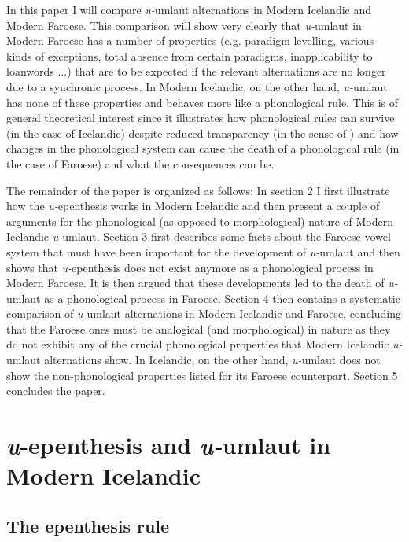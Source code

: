 \documentclass[output=paper,
modfonts
]{LSP/langsci}
\begin{document}
In this paper I will compare \emph{u-}umlaut alternations in Modern
Icelandic and Modern Faroese. This comparison will show very clearly
that \emph{u-}umlaut in Modern Faroese has a number of properties (e.g.
paradigm levelling, various kinds of exceptions, total absence from
certain paradigms, inapplicability to loanwords ...) that are to be
expected if the relevant alternations are no longer due to a synchronic
process. In Modern Icelandic, on the other hand, \emph{u-}umlaut has
none of these properties and behaves more like a phonological rule. This
is of general theoretical interest since it illustrates how phonological
rules can survive (in the case of Icelandic) despite reduced
transparency (in the sense of \citealt{kiparsky1973}) and how changes in the
phonological system can cause the death of a phonological rule (in the
case of Faroese) and what the consequences can be.

The remainder of the paper is organized as follows: In section 2 I first
illustrate how the \emph{u-}epenthesis works in Modern Icelandic and
then present a couple of arguments for the phonological (as opposed to
morphological) nature of Modern Icelandic \emph{u-}umlaut. Section 3
first describes some facts about the Faroese vowel system that must have
been important for the development of \emph{u-}umlaut and then shows
that \emph{u-}epenthesis does not exist anymore as a phonological
process in Modern Faroese. It is then argued that these developments led
to the death of \emph{u-}umlaut as a phonological process in Faroese.
Section 4 then contains a systematic comparison of \emph{u-}umlaut
alternations in Modern Icelandic and Faroese, concluding that the
Faroese ones must be analogical (and morphological) in nature as they do
not exhibit any of the crucial phonological properties that Modern
Icelandic \emph{u-}umlaut alternations show. In Icelandic, on the other
hand, \emph{u-}umlaut does not show the non-phonological properties
listed for its Faroese counterpart. Section 5 concludes the paper.

\section{\emph{u}-epenthesis and \emph{u-}umlaut in Modern Icelandic}

\subsection{The epenthesis rule}\label{the-epenthesis-rule}
\end{document}
